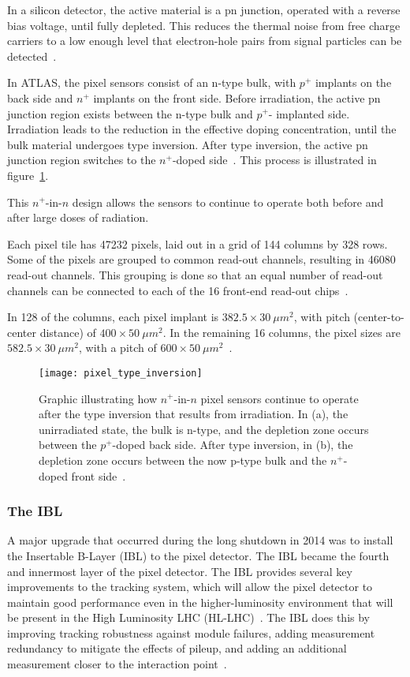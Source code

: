 In a silicon detector, the active material is a pn junction, operated with a reverse bias voltage,
until fully depleted.
This reduces the thermal noise from free charge carriers to a low enough level that electron-hole pairs
from signal particles can be detected~\cite{spieler-2005}.

In ATLAS, the pixel sensors consist of an n-type bulk, with $p^+$ implants on the back side and $n^+$ implants on the front side.
Before irradiation, the active pn junction region exists between the n-type bulk and $p^+$- implanted side.
Irradiation leads to the reduction in the effective doping concentration,
until the bulk material undergoes type inversion.
After type inversion, the active pn junction region switches to the $n^+$-doped side~\cite{pixels-2008}.
This process is illustrated in figure~\ref{fig:pixel_type_inversion}.

This $n^+$-in-$n$ design allows the sensors to continue to operate both before and after large doses of radiation.

Each pixel tile has 47232 pixels, laid out in a grid of 144 columns by 328 rows.
Some of the pixels are grouped to common read-out channels, resulting in 46080 read-out channels.
This grouping is done so that an equal number of read-out channels can be connected to each of
the 16 front-end read-out chips~\cite{pixels-2008}.

In 128 of the columns, each pixel implant is $382.5\times30~\mu m^2$, with pitch (center-to-center distance) of  $400\times50~\mu m^2$.
In the remaining 16 columns, the pixel sizes are $582.5\times30~\mu m^2$, with a pitch of  $600\times50~\mu m^2$~\cite{pixels-2008}.

\begin{figure}[!ht]\centering
\texttt{[image: pixel\_type\_inversion]}
\caption{Graphic illustrating how $n^+$-in-$n$ pixel sensors continue to operate after the type inversion that results from irradiation.
In (a), the unirradiated state, the bulk is n-type, and the depletion zone occurs between the $p^+$-doped back side.
After type inversion, in (b), the depletion zone occurs between the now p-type bulk and the $n^+$-doped front side~\cite{pixels-2008}.}
\label{fig:pixel_type_inversion}
\end{figure}

\subsubsection{The IBL}
A major upgrade that occurred during the long shutdown in 2014 was to install the Insertable B-Layer (IBL) to the pixel detector.
The IBL became the fourth and innermost layer of the pixel detector.
The IBL provides several key improvements to the tracking system, which will allow the pixel detector to maintain
good performance even in the higher-luminosity environment that will be present in the High Luminosity LHC (HL-LHC)~\cite{ibl-tdr}.
The IBL does this by improving tracking robustness against module failures,
adding measurement redundancy to mitigate the effects of pileup,
and adding an additional measurement closer to the interaction point~\cite{ibl-tdr}.

